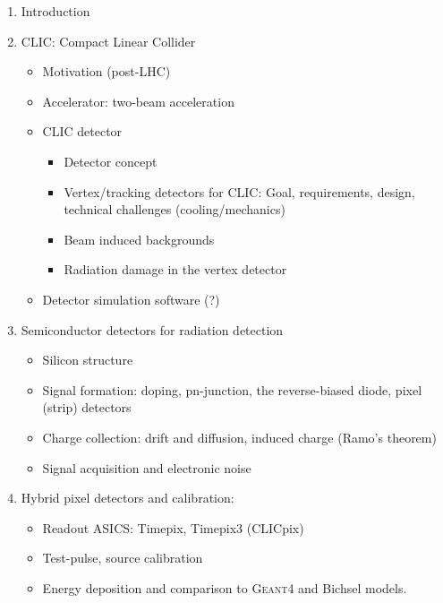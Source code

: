

\begin{enumerate}

\item Introduction
\item CLIC: Compact Linear Collider
  \begin{itemize}
  \item Motivation (post-LHC)
  \item Accelerator: two-beam acceleration
  \item CLIC detector
    \begin{itemize}
    \item Detector concept
    \item Vertex/tracking detectors for CLIC: Goal, requirements,
      design, technical challenges (cooling/mechanics) 
    \item Beam induced backgrounds
    \item Radiation damage in the vertex detector
    \end{itemize}
  \item Detector simulation software (?)
  \end{itemize}

\item Semiconductor detectors for radiation detection
  \begin{itemize}
  \item Silicon structure
  \item Signal formation: doping, pn-junction, the
    reverse-biased diode, pixel (strip) detectors
  \item Charge collection: drift and diffusion, induced charge (Ramo's
    theorem)
  \item Signal acquisition and electronic noise
  \end{itemize}

\item Hybrid pixel detectors and calibration:
  \begin{itemize}
  \item Readout ASICS: Timepix, Timepix3 (CLICpix)
  \item Test-pulse, source calibration 
  \item Energy deposition and comparison to \textsc{Geant4} and Bichsel models.
  \end{itemize}


\end{enumerate}
